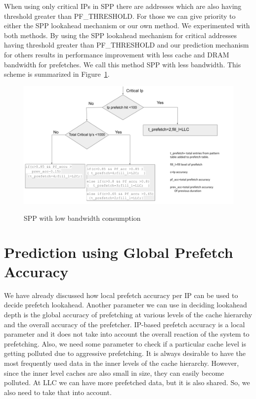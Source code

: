 When using only critical IPs in SPP there are addresses which are also having threshold greater than PF\_THRESHOLD. For those we can give priority to either the SPP lookahead mechanism or our own method. We experimented with both methods. By using the SPP lookahead mechanism for critical addresses having threshold greater than PF\_THRESHOLD and our prediction mechanism for others results in performance improvement with less cache and DRAM bandwidth for prefetches. We call this method SPP with less bandwidth. This scheme is summarized in Figure~\ref{fig:lessbw}.
\begin{figure}[H]
{\includegraphics[scale=0.45]{images/Less_Band.png}}\par\medskip
\caption{SPP with low bandwidth consumption}
\label{fig:lessbw}
\end{figure}

\section{Prediction using Global Prefetch Accuracy}

We have already discussed how local prefetch accuracy per IP can be used to decide prefetch lookahead.
Another parameter we can use in deciding 
lookahead depth is the global accuracy of prefetching at various levels of the cache hierarchy and the overall accuracy
of the prefetcher. IP-based prefetch accuracy is a local parameter and it does not take into account the overall reaction
of the system to prefetching. Also, we need some parameter to check if a particular cache level is getting polluted due to aggressive prefetching.
It is always desirable to have the most frequently used data in the inner levels of the cache hierarchy. However, since the
inner level caches are also small in size, they can easily become polluted. At LLC we can have
more prefetched data, but it is also shared. So, we also need to take that into account.

